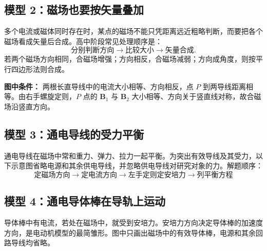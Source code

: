 \subsection*{模型 2：磁场也要按矢量叠加}

多个电流或磁体同时存在时，某点的磁场不能只凭距离远近粗略判断，而要把各个磁场看成矢量后合成。高中阶段常见处理顺序是：
\[
\text{分别判断方向}\rightarrow\text{比较大小}\rightarrow\text{矢量合成}.
\]
若两个磁场方向相同，合磁场增强；方向相反，合磁场减弱；方向成角度，则按平行四边形法则合成。

\textbf{图中条件：} 两根长直导线中的电流大小相等、方向相反，点 $P$ 到两导线距离相等。由右手螺旋定则，$P$ 点的 $\boldsymbol B_1$ 与 $\boldsymbol B_2$ 大小相等、方向关于竖直线对称，故合磁场沿竖直方向。

\begin{center}


\label{fig:magnetic-superposition}
\end{center}

\subsection*{模型 3：通电导线的受力平衡}

通电导线在磁场中常和重力、弹力、拉力一起平衡。为突出有效导线及其受力，以下示意图省略电源和其余供电导线，并忽略供电导线对研究对象的力。解题顺序：
\[
\text{定磁场方向} \to \text{定电流方向} \to \text{左手定则定安培力} \to \text{列平衡方程}
\]

\begin{center}


\label{fig:ampere-balance}
\end{center}

\subsection*{模型 4：通电导体棒在导轨上运动}

导体棒中有电流，若处在磁场中，就受到安培力。安培力方向决定导体棒的加速度方向，是电动机模型的最简雏形。图中只画出磁场中的有效导体棒，电源和其余回路导线均省略。

\begin{center}


\label{fig:rail-ampere-force}
\end{center}

